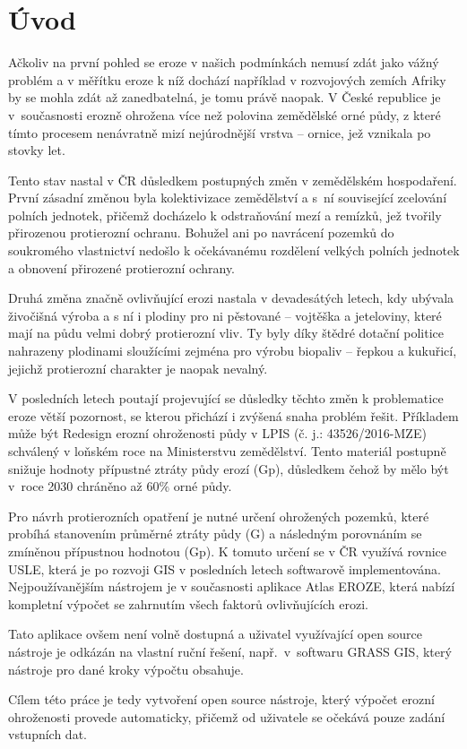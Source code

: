 \chapter{Úvod}

Ačkoliv na první pohled se eroze v našich podmínkách nemusí zdát jako
vážný \hbox{problém} a v měřítku eroze k níž dochází například v rozvojových
zemích Afriky by se mohla zdát až zanedbatelná, je tomu právě
naopak. V České republice je v~současnosti erozně ohrožena více než
polovina\cite{janecek2012} zemědělské orné půdy, z které tímto procesem nenávratně mizí
nejúrodnější vrstva – ornice, jež vznikala po stovky let.

Tento stav nastal v ČR důsledkem postupných změn v zemědělském
hospodaření. První zásadní změnou byla kolektivizace zemědělství a s~ní
související zcelování polních jednotek, přičemž docházelo k
odstraňování mezí a remízků, jež tvořily přiroze\-nou protierozní
ochranu. Bohužel ani po navrácení pozemků do soukromého vlastnictví
nedošlo k očekávanému rozdělení velkých polních jednotek a obnovení
přirozené protierozní ochrany.

Druhá změna značně ovlivňující erozi nastala v devadesátých letech,
kdy ubývala živočišná výroba a s ní i plodiny pro ni pěstované –
vojtěška a jeteloviny, které mají na půdu velmi dobrý protierozní
vliv. Ty byly díky štědré dotační politice nahrazeny plodinami
sloužícími zejména pro výrobu biopaliv – řepkou a kukuřicí, jejichž
protierozní charakter je naopak nevalný.

V posledních letech poutají projevující se důsledky těchto změn k
problematice eroze větší pozornost, se kterou přichází i zvýšená snaha
problém řešit. Příkladem může být Redesign erozní ohroženosti půdy v
LPIS (č. j.: 43526/2016-MZE) schválený v loňském roce na Ministerstvu
zemědělství. Tento materiál postupně snižuje hodnoty přípustné ztráty
půdy erozí (Gp), důsledkem čehož by mělo být v~roce 2030 chráněno až
60\% orné půdy.\cite{kalkulacka}

Pro návrh protierozních opatření je nutné určení ohrožených pozemků,
které probíhá stanovením průměrné ztráty půdy (G) a následným
porovnáním se zmíněnou přípustnou hodnotou (Gp). K tomuto určení se v
ČR využívá rovnice USLE, která je po rozvoji GIS v posledních letech
softwarově implementována. Nejpoužívanějším nástrojem je v současnosti
aplikace Atlas EROZE, která nabízí kompletní výpočet se zahrnutím
všech faktorů ovlivňujících erozi.

Tato aplikace ovšem není volně dostupná a uživatel využívající open
source nástroje je odkázán na vlastní ruční řešení, např.~v~softwaru
GRASS GIS, který nástroje pro dané kroky výpočtu obsahuje.

Cílem této práce je tedy vytvoření open source nástroje, který výpočet
erozní ohroženosti provede automaticky, přičemž od uživatele se
očekává pouze zadání \hbox{vstupních} dat.
